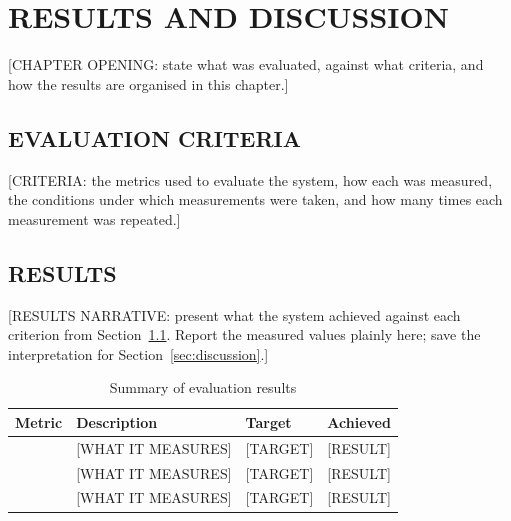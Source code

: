 %
\chapter{RESULTS AND DISCUSSION}
\label{ch:results}

[CHAPTER OPENING: state what was evaluated, against what criteria, and
how the results are organised in this chapter.]

\section{EVALUATION CRITERIA}
\label{sec:evaluation-criteria}

[CRITERIA: the metrics used to evaluate the system, how each was
measured, the conditions under which measurements were taken, and how
many times each measurement was repeated.]

\section{RESULTS}
\label{sec:results}

[RESULTS NARRATIVE: present what the system achieved against each
criterion from Section~\ref{sec:evaluation-criteria}. Report the
measured values plainly here; save the interpretation for
Section~\ref{sec:discussion}.]

\begin{table}[H]
  \centering
  \caption{Summary of evaluation results}
  \label{tab:results-summary}
  \small
  \begin{tabularx}{\textwidth}{|l|X|l|l|}
    \hline
    \textbf{Metric} & \textbf{Description} & \textbf{Target} & \textbf{Achieved} \\
    \hline
    [METRIC 1] & [WHAT IT MEASURES] & [TARGET] & [RESULT] \\
    \hline
    [METRIC 2] & [WHAT IT MEASURES] & [TARGET] & [RESULT] \\
    \hline
    [METRIC 3] & [WHAT IT MEASURES] & [TARGET] & [RESULT] \\
    \hline
  \end{tabularx}
\end{table}

